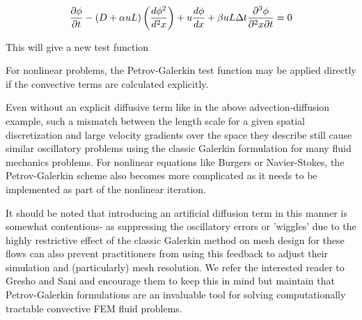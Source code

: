 \begin{equation}
  \frac{\partial\phi}{\partial{t}}-\left( D+{\alpha}uL \right)\left( \frac{d\phi^2}{d^2x} \right)+u\frac{d\phi}{dx}+\beta{uL\Delta{t}}\frac{\partial^3\phi}{\partial^2{x}\partial{t}}=0
\end{equation}

This will give a new test function 


For nonlinear problems, the Petrov-Galerkin test function may be applied directly if the convective terms are calculated explicitly. 

Even without an explicit diffusive term like in the above advection-diffusion example, such a mismatch between the length scale for a given spatial discretization and large velocity gradients over the space they describe still cause similar oscillatory problems using the classic Galerkin formulation for many fluid mechanics problems. For nonlinear equations like Burgers or Navier-Stokes, the Petrov-Galerkin scheme also becomes more complicated as it needs to be implemented as part of the nonlinear iteration. 

It should be noted that introducing an artificial diffusion term in this manner is somewhat contentious- as suppressing the oscillatory errors or 'wiggles' due to the highly restrictive effect of the classic Galerkin method on mesh design for these flows can also prevent practitioners from using this feedback to adjust their simulation and (particularly) mesh resolution. We refer the interested reader to Gresho and Sani and encourage them to keep this in mind but maintain that Petrov-Galerkin formulations are an invaluable tool for solving computationally tractable convective FEM fluid problems.


